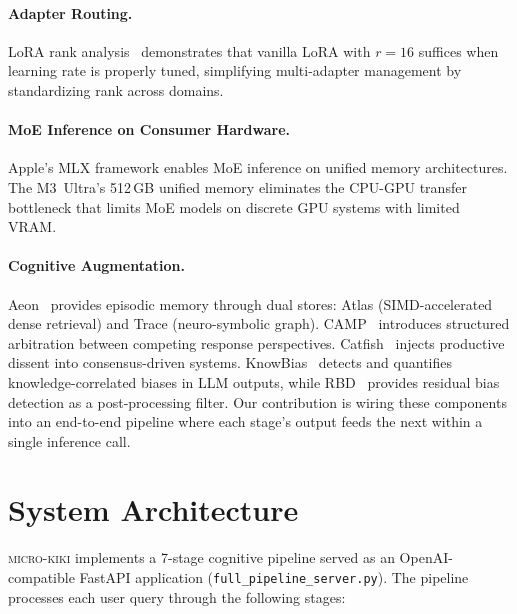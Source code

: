 \documentclass[11pt,a4paper]{article}
\begin{document}
\paragraph{Adapter Routing.}
LoRA rank analysis~\citep{lora_rank2025} demonstrates that vanilla LoRA with $r=16$ suffices when learning rate is properly tuned, simplifying multi-adapter management by standardizing rank across domains.

\paragraph{MoE Inference on Consumer Hardware.}
Apple's MLX framework enables MoE inference on unified memory architectures. The M3~Ultra's 512\,GB unified memory eliminates the CPU-GPU transfer bottleneck that limits MoE models on discrete GPU systems with limited VRAM.

\paragraph{Cognitive Augmentation.}
Aeon~\citep{aeon2025} provides episodic memory through dual stores: Atlas (SIMD-accelerated dense retrieval) and Trace (neuro-symbolic graph). CAMP~\citep{camp2026} introduces structured arbitration between competing response perspectives. Catfish~\citep{catfish2025} injects productive dissent into consensus-driven systems. KnowBias~\citep{knowbias2025} detects and quantifies knowledge-correlated biases in LLM outputs, while RBD~\citep{rbd2025} provides residual bias detection as a post-processing filter. Our contribution is wiring these components into an end-to-end pipeline where each stage's output feeds the next within a single inference call.

\section{System Architecture}
\label{sec:architecture}

\textsc{micro-kiki} implements a 7-stage cognitive pipeline served as an OpenAI-compatible FastAPI application (\texttt{full\_pipeline\_server.py}). The pipeline processes each user query through the following stages:
\end{document}
